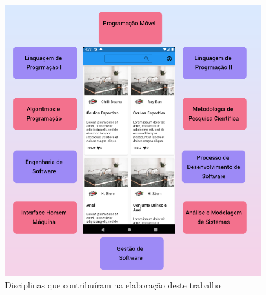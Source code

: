 \documentclass[12pt]{article}
\begin{document}
\begin{figure}[ht!]
\centering
\includegraphics[width=1.0\textwidth]{imagens/disciplinas.png}
\caption{Disciplinas que contribuíram na elaboração deste trabalho}
\label{fig:disciplinas}
\end{figure}
\end{document}
